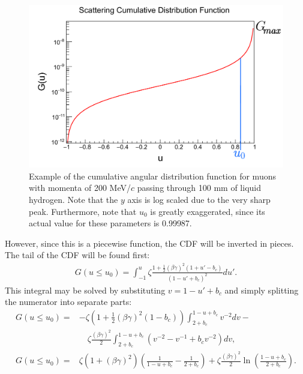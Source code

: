 \begin{figure}
  \centering
    \includegraphics[width=\textwidth]{Figures/scatdist_example} 
  \caption[Example of the COSY cumulative angular distribution function.]{Example of the cumulative angular distribution function for muons with momenta of 200 MeV/$c$ passing through 100 mm of liquid hydrogen. Note that the $y$ axis is log scaled due to the very sharp peak. Furthermore, note that $u_0$ is greatly exaggerated, since its actual value for these parameters is 0.99987.}
  \label{fig:scatdist_example}
\end{figure}

However, since this is a piecewise function, the CDF will be inverted in pieces. The tail of the CDF will be found first:
\begin{align*}
G(u\leq u_0)=\int _{-1} ^u \zeta \frac{1+\frac{1}{2}(\beta\gamma)^2 (1+u'-b_c)}{(1-u'+b_c)^2} du'.
\end{align*}
This integral may be solved by substituting $v=1-u'+b_c$ and simply splitting the numerator into separate parts:
\begin{align}
\nonumber
G(u\leq u_0)=&-\zeta(1+\frac{1}{2}(\beta\gamma)^2(1-b_c))\int_{2+b_c} ^{1-u+b_c} v^{-2} dv - \\
\nonumber
& \quad \zeta \frac{(\beta\gamma)^2}{2}\int_{2+b_c} ^{1-u+b_c} (v^{-2} - v^{-1} + b_c v^{-2}) dv,\\
G(u\leq u_0)=&\zeta(1+(\beta\gamma)^2)\left(\frac{1}{1-u+b_c} - \frac{1}{2+b_c}\right)+\zeta \frac{(\beta\gamma)^2}{2} \ln\left(\frac{1-u+b_c}{2+b_c}\right). \label{eqn:cosyGTail}
\end{align}

